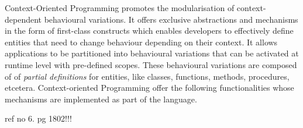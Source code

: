 \documentclass{acm_proc_article-sp}
\begin{document}
Context-Oriented Programming promotes the modularisation of context-dependent behavioural variations. It offers exclusive abstractions and mechanisms in the form of first-class constructs which enables developers to effectively define entities that need to change behaviour depending on their context. It allows applications to be partitioned into behavioural variations that can be activated at runtime level with pre-defined scopes. These behavioural variations are composed of of \textit{partial definitions} for entities, like classes, functions, methods, procedures, etcetera. Context-oriented Programming offer the following functionalities whose mechanisms are implemented as part of the language.






ref no 6. pg 1802!!!

%

%
%
\end{document}
